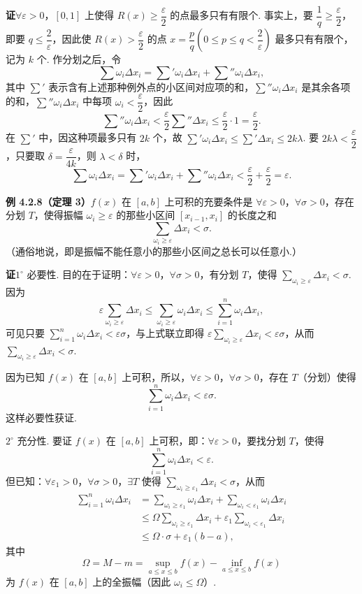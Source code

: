 \documentclass[UTF8,12pt,a4paper,fontset=fandol]{ctexart}
\begin{document}
\noindent\textbf{证}\quad $\forall\varepsilon>0$，$[0,1]$ 上使得 $R(x)\ge\dfrac{\varepsilon}{2}$ 的点最多只有有限个. 事实上，要 $\dfrac1q\ge\dfrac{\varepsilon}{2}$，即要 $q\le\dfrac2\varepsilon$，因此使 $R(x)>\dfrac{\varepsilon}{2}$ 的点 $x=\dfrac pq\left(0\le p\le q<\dfrac2\varepsilon\right)$ 最多只有有限个，记为 $k$ 个. 作分划之后，令
\[
\sum\omega_i\Delta x_i=\sum'\omega_i\Delta x_i+\sum''\omega_i\Delta x_i,
\]
其中 $\sum'$ 表示含有上述那种例外点的小区间对应项的和，$\sum''\omega_i\Delta x_i$ 是其余各项的和，$\sum''\omega_i\Delta x_i$ 中每项 $\omega_i<\dfrac{\varepsilon}{2}$，因此
\[
\sum''\omega_i\Delta x_i<\frac{\varepsilon}{2}\sum''\Delta x_i\le\frac{\varepsilon}{2}\cdot1=\frac{\varepsilon}{2}.
\]
在 $\sum'$ 中，因这种项最多只有 $2k$ 个，故 $\sum'\omega_i\Delta x_i\le\sum'\Delta x_i\le2k\lambda$. 要 $2k\lambda<\dfrac{\varepsilon}{2}$，只要取 $\delta=\dfrac{\varepsilon}{4k}$，则 $\lambda<\delta$ 时，
\[
\sum\omega_i\Delta x_i=\sum'\omega_i\Delta x_i+\sum''\omega_i\Delta x_i<\frac{\varepsilon}{2}+\frac{\varepsilon}{2}=\varepsilon.
\]

\noindent\textbf{例 4.2.8（定理 3）}\quad $f(x)$ 在 $[a,b]$ 上可积的充要条件是 $\forall\varepsilon>0$，$\forall\sigma>0$，存在分划 $T$，使得振幅 $\omega_i\ge\varepsilon$ 的那些小区间 $[x_{i-1},x_i]$ 的长度之和
\[
\sum_{\omega_i\ge\varepsilon}\Delta x_i<\sigma.
\]
（通俗地说，即是振幅不能任意小的那些小区间之总长可以任意小.）

\noindent\textbf{证}\quad $1^\circ$ 必要性. 目的在于证明：$\forall\varepsilon>0$，$\forall\sigma>0$，有分划 $T$，使得 $\sum_{\omega_i\ge\varepsilon}\Delta x_i<\sigma$. 因为
\[
\varepsilon\sum_{\omega_i\ge\varepsilon}\Delta x_i
\le\sum_{\omega_i\ge\varepsilon}\omega_i\Delta x_i
\le\sum_{i=1}^n\omega_i\Delta x_i,
\]
可见只要 $\sum_{i=1}^n\omega_i\Delta x_i<\varepsilon\sigma$，与上式联立即得 $\varepsilon\sum_{\omega_i\ge\varepsilon}\Delta x_i<\varepsilon\sigma$，从而 $\sum_{\omega_i\ge\varepsilon}\Delta x_i<\sigma$.

因为已知 $f(x)$ 在 $[a,b]$ 上可积，所以，$\forall\varepsilon>0$，$\forall\sigma>0$，存在 $T$（分划）使得
\[
\sum_{i=1}^n\omega_i\Delta x_i<\varepsilon\sigma.
\]
这样必要性获证.

$2^\circ$ 充分性. 要证 $f(x)$ 在 $[a,b]$ 上可积，即：$\forall\varepsilon>0$，要找分划 $T$，使得
\[
\sum_{i=1}^n\omega_i\Delta x_i<\varepsilon.
\tag{1}
\]
但已知：$\forall\varepsilon_1>0$，$\forall\sigma>0$，$\exists T$ 使得 $\sum_{\omega_i\ge\varepsilon_1}\Delta x_i<\sigma$，从而
\[
\begin{aligned}
\sum_{i=1}^n\omega_i\Delta x_i
&=\sum_{\omega_i\ge\varepsilon_1}\omega_i\Delta x_i
+\sum_{\omega_i<\varepsilon_1}\omega_i\Delta x_i\\
&\le \Omega\sum_{\omega_i\ge\varepsilon_1}\Delta x_i
+\varepsilon_1\sum_{\omega_i<\varepsilon_1}\Delta x_i\\
&\le\Omega\cdot\sigma+\varepsilon_1(b-a),
\end{aligned}
\tag{2}
\]
其中
\[
\Omega=M-m=\sup_{a\le x\le b}f(x)-\inf_{a\le x\le b}f(x)
\]
为 $f(x)$ 在 $[a,b]$ 上的全振幅（因此 $\omega_i\le\Omega$）.
\end{document}
